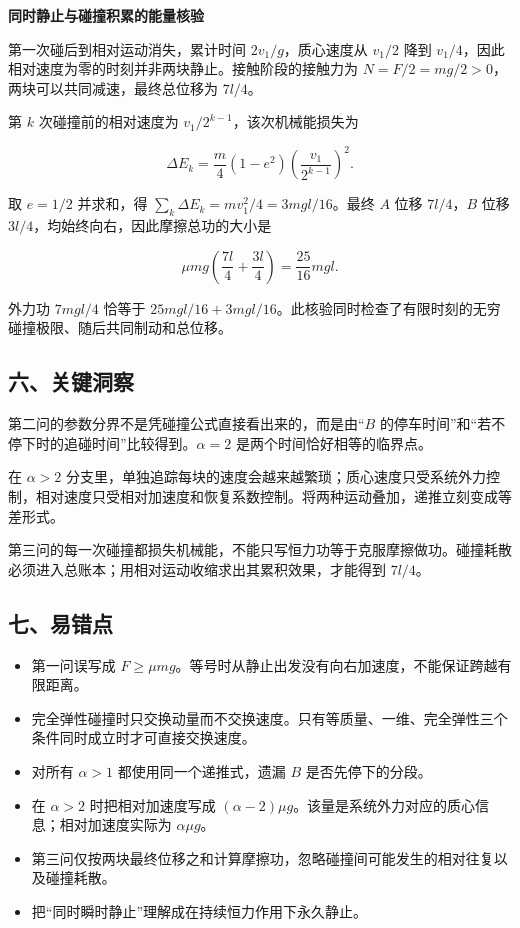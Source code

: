 \documentclass[12pt,a4paper,UTF8]{ctexart}
\newcommand{\tightlist}{\setlength{\itemsep}{0pt}\setlength{\parskip}{0pt}}
\begin{document}
\textbf{同时静止与碰撞积累的能量核验}

第一次碰后到相对运动消失，累计时间 \(2v_1/g\)，质心速度从 \(v_1/2\) 降到
\(v_1/4\)，因此相对速度为零的时刻并非两块静止。接触阶段的接触力为
\(N=F/2=mg/2>0\)，两块可以共同减速，最终总位移为 \(7l/4\)。

第 \(k\) 次碰撞前的相对速度为 \(v_1/2^{k-1}\)，该次机械能损失为

\[\Delta E_k=\frac m4(1-e^2)\left(\frac{v_1}{2^{k-1}}\right)^2.\]

取 \(e=1/2\) 并求和，得 \(\sum_k\Delta E_k=mv_1^2/4=3mgl/16\)。最终
\(A\) 位移 \(7l/4\)，\(B\) 位移
\(3l/4\)，均始终向右，因此摩擦总功的大小是

\[\mu mg\left(\frac{7l}4+\frac{3l}4\right)=\frac{25}{16}mgl.\]

外力功 \(7mgl/4\) 恰等于
\(25mgl/16+3mgl/16\)。此核验同时检查了有限时刻的无穷碰撞极限、随后共同制动和总位移。

\subsection{六、关键洞察}\label{ux516dux5173ux952eux6d1eux5bdf-1}

第二问的参数分界不是凭碰撞公式直接看出来的，而是由``\(B\)
的停车时间''和``若不停下时的追碰时间''比较得到。\(\alpha=2\)
是两个时间恰好相等的临界点。

在 \(\alpha>2\)
分支里，单独追踪每块的速度会越来越繁琐；质心速度只受系统外力控制，相对速度只受相对加速度和恢复系数控制。将两种运动叠加，递推立刻变成等差形式。

第三问的每一次碰撞都损失机械能，不能只写恒力功等于克服摩擦做功。碰撞耗散必须进入总账本；用相对运动收缩求出其累积效果，才能得到
\(7l/4\)。

\subsection{七、易错点}\label{ux4e03ux6613ux9519ux70b9-1}

\begin{itemize}
\tightlist
\item
  第一问误写成
  \(F\geq\mu mg\)。等号时从静止出发没有向右加速度，不能保证跨越有限距离。
\item
  完全弹性碰撞时只交换动量而不交换速度。只有等质量、一维、完全弹性三个条件同时成立时才可直接交换速度。
\item
  对所有 \(\alpha>1\) 都使用同一个递推式，遗漏 \(B\) 是否先停下的分段。
\item
  在 \(\alpha>2\) 时把相对加速度写成
  \((\alpha-2)\mu g\)。该量是系统外力对应的质心信息；相对加速度实际为
  \(\alpha\mu g\)。
\item
  第三问仅按两块最终位移之和计算摩擦功，忽略碰撞间可能发生的相对往复以及碰撞耗散。
\item
  把``同时瞬时静止''理解成在持续恒力作用下永久静止。
\end{itemize}
\end{document}
